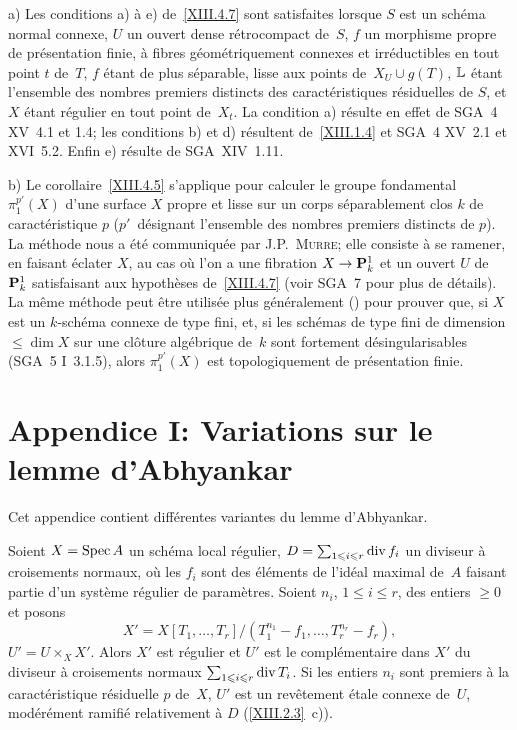 \begin{remarques}
\label{rem:XIII.4.6}
a) Les conditions a) \`a e) de~\ref{XIII.4.7} sont
satisfaites lorsque $S$ est un sch\'ema normal connexe, $U$ un
ouvert dense r\'etrocompact de~$S$, $f$ un morphisme propre de
pr\'esentation finie, \`a fibres g\'eom\'etriquement connexes
et irr\'eductibles en tout point $t$ de~$T$, $f$ \'etant de plus
s\'eparable,
lisse aux points de~$X_U\cup g(T)$, $\mathbb{L}$ \'etant l'ensemble des
nombres premiers distincts des caract\'eristiques r\'esiduelles de
$S$, et $X$ \'etant r\'egulier en tout point de~$X_t$. La
condition a) r\'esulte en effet de SGA~4 XV~4.1 et 1.4; les
conditions b) et d) r\'esultent de~\ref{XIII.1.4} et SGA~4 XV~2.1 et
XVI~5.2. Enfin e) r\'esulte de SGA~XIV~1.11.
\par\smallskip
b) Le corollaire~\ref{XIII.4.5} s'applique pour calculer le
groupe fondamental $\pi_1^{p'}(X)$ d'une surface $X$ propre et lisse
sur un corps s\'eparablement clos $k$ de caract\'eristique $p$
($p'$~d\'esignant l'ensemble des nombres premiers distincts de
$p$). La m\'ethode nous a \'et\'e communiqu\'ee par
J.P.\, \textsc{Murre}; elle consiste \`a se ramener, en faisant \'eclater
$X$, au cas o\`u l'on a une fibration $X\to\PP^1_k$ et un ouvert $U$
de~$\mathbf{P}^1_k$ satisfaisant aux hypoth\`eses de~\ref{XIII.4.7} (voir
SGA~7 pour plus de d\'etails). La m\^eme m\'ethode peut \^etre
utilis\'ee plus g\'en\'eralement (\loccit) pour prouver que, si
$X$ est un $k$-sch\'ema connexe de type fini, et, si les sch\'emas
de type fini de dimension $\leq\dim X$ sur une cl\^oture
alg\'ebrique de~$k$ sont fortement d\'esingularisables
(SGA~5 I~3.1.5), alors $\pi_1^{p'}(X)$ est topologiquement de
pr\'esentation finie.
\end{remarques}

\section{Appendice I: Variations sur le lemme d'Abhyankar}
\label{XIII.5}
Cet appendice contient diff\'erentes variantes du lemme d'Abhyankar.

\begin{proposition}
\label{XIII.5.1} Soient $X=\operatorname{Spec} A$ un sch\'ema local r\'egulier,
$D=\sum_{1\leqslant i\leqslant r} \operatorname{\mathrm{div}} f_i$ un diviseur \`a croisements
normaux, o\`u les $f_i$ sont des \'el\'ements de l'id\'eal
maximal de~$A$ faisant partie d'un syst\`eme r\'egulier de
param\`etres. Soient $n_i$, $1\leq i\leq r$, des entiers $\geq 0$
et posons
$$
X'=X[T_1,\dots,T_r]/(T_1^{n_1}-f_1,\dots,T_r^{n_r}-f_r),
$$
$U'=U\times_X X'$. Alors $X'$ est r\'egulier et $U'$ est le
compl\'ementaire dans $X'$ du diviseur \`a croisements normaux
$\sum_{1\leqslant i\leqslant r}\operatorname{\mathrm{div}} T_i$. Si les entiers $n_i$ sont premiers
\`a la caract\'eristique r\'esiduelle $p$ de~$X$, $U'$ est un
rev\^etement \'etale connexe de~$U$, mod\'er\'ement
ramifi\'e relativement \`a $D$ \textup{(\ref{XIII.2.3}~c))}.
\end{proposition}


